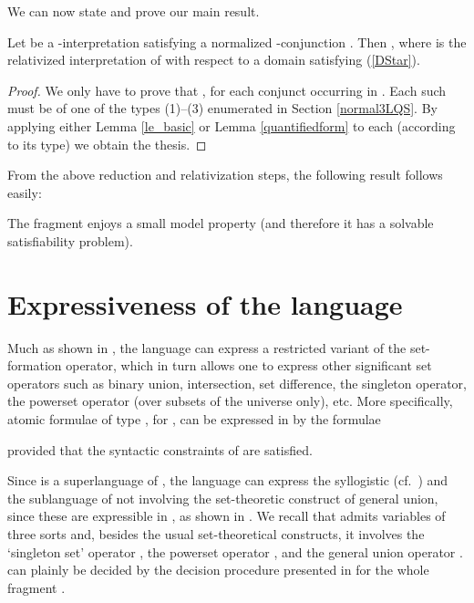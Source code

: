 \documentclass{fundam}
\begin{document}
We can now state and prove our main result.
\begin{theorem}\label{correctness}
Let  be a -interpretation satisfying a normalized
-conjunction .  Then , where
 is the relativized interpretation of  with respect
to a domain  satisfying (\ref{DStar}).
\end{theorem}
\begin{proof}
We only have to prove that , for each conjunct
 occurring in .  Each such  must be of one of the
types (1)--(3) enumerated in Section \ref{normal3LQS}.  By applying
either Lemma \ref{le_basic} or Lemma \ref{quantifiedform} to each
 (according to its type) we obtain the thesis.
\end{proof}
From the above reduction and relativization steps, the following
result follows easily:
\begin{corollary}
    The fragment  enjoys a small model property (and
    therefore it has a solvable satisfiability problem). \end{corollary}





\section{Expressiveness of the language }\label{sec:applications}
\label{expressiveness}
Much as shown in \cite{CanNic08}, the language  can express a
restricted variant of the set-formation operator, which in turn allows one to
express other significant set operators such as binary union,
intersection, set difference, the singleton operator, the powerset
operator (over subsets of the universe only), etc.  More specifically,
atomic formulae of type , for , can be expressed in  by
the formulae

provided that the syntactic constraints of  are satisfied.


Since  is a superlanguage of , the language
 can express the syllogistic  (cf.\ \cite{FerOm1978}) and
the sublanguage  of  not involving the set-theoretic
construct of general union, since these are expressible in
, as shown in \cite{CanNic08}.  We recall that
 admits variables of three sorts and, besides the usual
set-theoretical constructs, it involves the `singleton set' operator
, the powerset operator , and the general union
operator .
 can plainly be decided by the decision procedure presented in
\cite{CanCut93} for the whole fragment .
\end{document}
